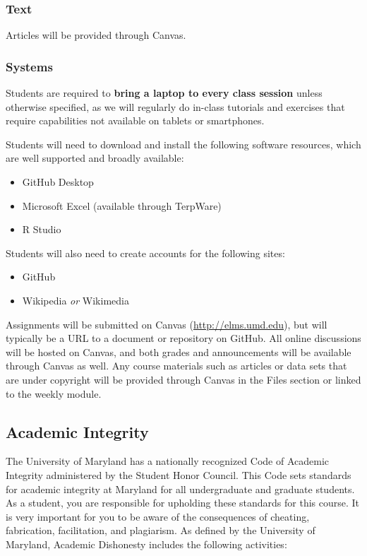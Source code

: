 \documentclass[11pt]{article}
\begin{document}
\subsubsection*{Text} Articles will be provided through Canvas. 
\subsubsection*{Systems} Students are required to \textbf{bring a laptop to every class session} unless otherwise specified, as we will regularly do in-class tutorials and exercises that require capabilities not available on tablets or smartphones.

Students will need to download and install the following software resources, which are well supported and broadly available:
\begin{itemize}
\item GitHub Desktop
\item Microsoft Excel (available through TerpWare)
\item R Studio
\end{itemize}

Students will also need to create accounts for the following sites:
\begin{itemize}
\item GitHub
\item Wikipedia \textit{or} Wikimedia
\end{itemize}

Assignments will be submitted on Canvas (\url{http://elms.umd.edu}), but will typically be a URL to a document or repository on GitHub. 
All online discussions will be hosted on Canvas, and both grades and announcements will be available through Canvas as well. 
Any course materials such as articles or data sets that are under copyright will be provided through Canvas in the Files section or linked to the weekly module. 

\subsection{Academic Integrity}

The University of Maryland has a nationally recognized Code of Academic Integrity administered by the Student Honor Council. 
This Code sets standards for academic integrity at Maryland for all undergraduate and graduate students. 
As a student, you are responsible for upholding these standards for this course. 
It is very important for you to be aware of the consequences of cheating, fabrication, facilitation, and plagiarism. As defined by the University of Maryland, Academic Dishonesty includes the following activities:
\end{document}
